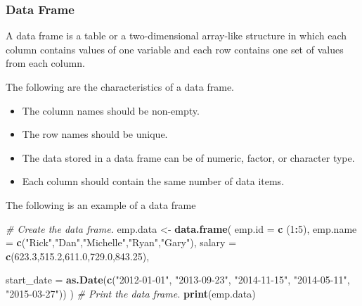 \documentclass[
]{book}
\newenvironment{Shaded}{\begin{snugshade}}{\end{snugshade}}
\newcommand{\AttributeTok}[1]{\textcolor[rgb]{0.13,0.29,0.53}{#1}}
\newcommand{\CommentTok}[1]{\textcolor[rgb]{0.56,0.35,0.01}{\textit{#1}}}
\newcommand{\DecValTok}[1]{\textcolor[rgb]{0.00,0.00,0.81}{#1}}
\newcommand{\FloatTok}[1]{\textcolor[rgb]{0.00,0.00,0.81}{#1}}
\newcommand{\FunctionTok}[1]{\textcolor[rgb]{0.13,0.29,0.53}{\textbf{#1}}}
\newcommand{\NormalTok}[1]{#1}
\newcommand{\OtherTok}[1]{\textcolor[rgb]{0.56,0.35,0.01}{#1}}
\newcommand{\SpecialCharTok}[1]{\textcolor[rgb]{0.81,0.36,0.00}{\textbf{#1}}}
\newcommand{\StringTok}[1]{\textcolor[rgb]{0.31,0.60,0.02}{#1}}
\begin{document}
\hypertarget{data-frame}{%
\subsubsection{Data Frame}\label{data-frame}}

A data frame is a table or a two-dimensional array-like structure in which each column contains values of one variable and each row contains one set of values from each column.

The following are the characteristics of a data frame.

\begin{itemize}
\item
  The column names should be non-empty.
\item
  The row names should be unique.
\item
  The data stored in a data frame can be of numeric, factor, or character type.
\item
  Each column should contain the same number of data items.
\end{itemize}

The following is an example of a data frame

\begin{Shaded}
\begin{Highlighting}[]
\CommentTok{\# Create the data frame.}
\NormalTok{emp.data }\OtherTok{\textless{}{-}} \FunctionTok{data.frame}\NormalTok{(}
   \AttributeTok{emp.id =} \FunctionTok{c}\NormalTok{ (}\DecValTok{1}\SpecialCharTok{:}\DecValTok{5}\NormalTok{), }
   \AttributeTok{emp.name =} \FunctionTok{c}\NormalTok{(}\StringTok{"Rick"}\NormalTok{,}\StringTok{"Dan"}\NormalTok{,}\StringTok{"Michelle"}\NormalTok{,}\StringTok{"Ryan"}\NormalTok{,}\StringTok{"Gary"}\NormalTok{),}
   \AttributeTok{salary =} \FunctionTok{c}\NormalTok{(}\FloatTok{623.3}\NormalTok{,}\FloatTok{515.2}\NormalTok{,}\FloatTok{611.0}\NormalTok{,}\FloatTok{729.0}\NormalTok{,}\FloatTok{843.25}\NormalTok{), }
   
   \AttributeTok{start\_date =} \FunctionTok{as.Date}\NormalTok{(}\FunctionTok{c}\NormalTok{(}\StringTok{"2012{-}01{-}01"}\NormalTok{, }\StringTok{"2013{-}09{-}23"}\NormalTok{, }\StringTok{"2014{-}11{-}15"}\NormalTok{, }\StringTok{"2014{-}05{-}11"}\NormalTok{,}
      \StringTok{"2015{-}03{-}27"}\NormalTok{))}
\NormalTok{)}
\CommentTok{\# Print the data frame.         }
\FunctionTok{print}\NormalTok{(emp.data) }
\end{Highlighting}
\end{Shaded}
\end{document}

